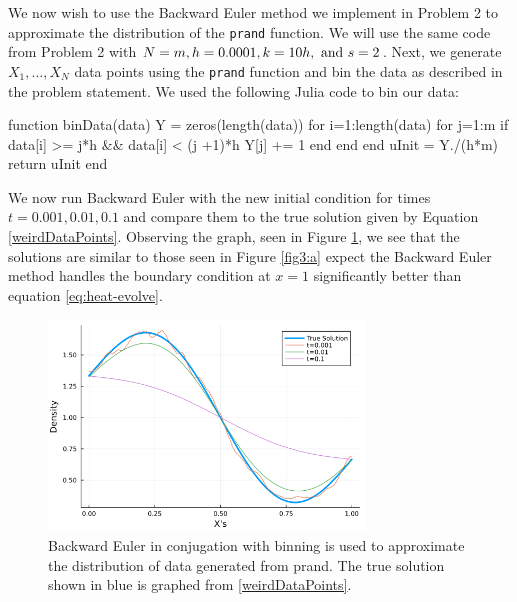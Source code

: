 \documentclass[12pt]{report}
\begin{document}
\begin{solution}

    \noindent
    We now wish to use the Backward Euler method we implement in Problem 2 to approximate the distribution of the \verb+prand+ function. We will use the same code from Problem 2 with $N=m, h=0.0001, k=10h, {~\text{and}~} s=2$. Next, we generate $X_1, \dots, X_N$ data points using the \verb+prand+ function and bin the data as described in the problem statement. We used the following Julia code to bin our data:
    \begin{python}
    function binData(data)
      Y = zeros(length(data))
      for i=1:length(data)
          for j=1:m
              if data[i] >= j*h && data[i] < (j +1)*h
                  Y[j] += 1
              end
          end
      end
      uInit = Y./(h*m)
      return uInit
    end
    \end{python}
    We now run Backward Euler with the new initial condition for times $t=0.001,0.01,0.1$ and compare them to the true solution given by Equation \ref{weirdDataPoints}. Observing the graph, seen in Figure \ref{fig4}, we see that the solutions are similar to those seen in Figure \ref{fig3:a} expect the Backward Euler method handles the boundary condition at $x=1$ significantly better than equation \ref{eq:heat-evolve}.



  \begin{figure}[H]
    \centering
    \includegraphics[width=0.75\textwidth,height=\textwidth,keepaspectratio]{images/4.png}
    \caption{Backward Euler in conjugation with binning is used to approximate the distribution of data generated from prand. The true solution shown in blue is graphed from \ref{weirdDataPoints}.}
    \label{fig4}
  \end{figure}
\end{solution}
\end{document}
